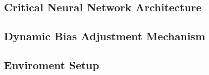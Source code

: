 \subsection{Critical Neural Network Architecture}



\subsection{Dynamic Bias Adjustment Mechanism}



\subsection{Enviroment Setup}



